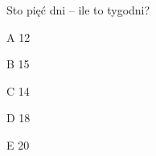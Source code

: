 \begin{tresc}
Sto pięć dni – ile to tygodni?
\end{tresc}
\begin{wariant}{A} 12 \end{wariant}
\begin{wariant}{B} 15 \end{wariant}
\begin{wariant}{C} 14 \end{wariant}
\begin{wariant}{D} 18 \end{wariant}
\begin{wariant}{E} 20 \end{wariant}
